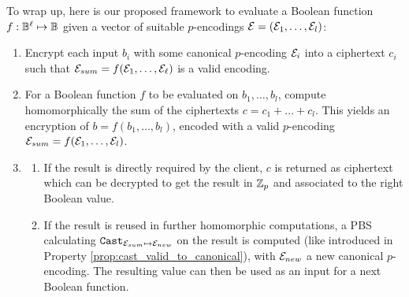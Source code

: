 To wrap up, here is our proposed framework to evaluate a Boolean function $f: \mathbb{B}^\ell \mapsto \mathbb{B}$ given a vector of suitable $p$-encodings $\mathcal{E} = (\mathcal{E}_1, \dots, \mathcal{E}_l)$:

\begin{enumerate}
\item Encrypt each input $b_i$ with some canonical $p$-encoding $\mathcal{E}_i$ into a ciphertext $c_i$ such that $\mathcal{E}_{sum} = f(\mathcal{E}_1, \dots, \mathcal{E}_\ell)$ is a valid encoding.
\item For a Boolean function $f$ to be evaluated on $b_1, \dots, b_l$, compute homomorphically the sum of the ciphertexts $c = c_1 + \dots + c_l$. This yields an encryption of $b = f(b_1, \dots, b_l)$, encoded with a valid $p$-encoding $\mathcal{E}_{sum} = f(\mathcal{E}_1, \dots, \mathcal{E}_l)$.
\item \begin{enumerate}
    \item If the result is directly required by the client, $c$ is returned as ciphertext which can be decrypted to get the result in $\mathbb{Z}_p$ and associated to the right Boolean value.
    \item If the result is reused in further homomorphic computations, a PBS calculating $\texttt{Cast}_{\mathcal{E}_{sum} \mapsto \mathcal{E}_{new}}$ on the result is computed (like introduced in Property \ref{prop:cast_valid_to_canonical}), with $\mathcal{E}_{new}$ a new canonical $p$-encoding. The resulting value can then be used as an input for a next Boolean function.
    \end{enumerate}
\end{enumerate}

